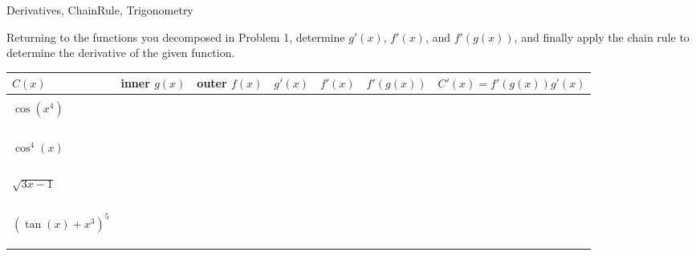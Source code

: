 

	








\begin{tagblock}{Derivatives, ChainRule, Trigonometry}
\begin{question}
	






Returning to the functions you decomposed in Problem 1, determine $g'(x)$, $f'(x)$, and $f'(g(x))$, and finally apply the chain rule to determine the derivative of the given function. 
\bigskip


\begin{tabular}{| l | c| c| c| c| c| c| } \hline
 $C(x)$ &  inner $g(x)$  & outer $f(x)$  & $g'(x)$ \hspace{.2in} & $f'(x)$ \hspace{.2in} & $f'(g(x))$ \hspace{.5in} & $C'(x)= f'(g(x))g'(x)$ \hspace{.3in}  \\ \hline
 &&&&&&\\

 $\cos(x^4)$ &&&&&& \\ 
&&&&&&\\
&&&&&&\\
&&&&&&\\ \hline 
&&&&&&\\

 $\cos^4(x)$ &&&&&& \\
&&&&&&\\
&&&&&&\\
&&&&&&\\ \hline 
&&&&&&\\

 $\sqrt{3x-1}$  &&&&&& \\ 
&&&&&&\\
&&&&&&\\
&&&&&&\\ \hline 
&&&&&&\\

 $(\tan(x) + x^3)^5$ &&&&&&\\ 
&&&&&&\\
&&&&&&\\
&&&&&&\\ \hline 
\end{tabular} 



\end{question}
\end{tagblock}
